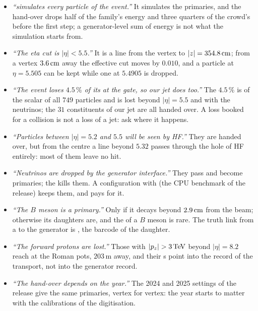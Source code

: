 \begin{pitfalls}
\begin{itemize}[nosep]
  \item \emph{``\GEANT simulates every particle of the event.''} It
    simulates the primaries, and the hand-over drops half of the family's
    energy and three quarters of the crowd's before the first step; a
    generator-level sum of energy is not what the simulation starts from.
  \item \emph{``The eta cut is $|\eta|<5.5$.''} It is a line from the vertex
    to $|z|=354.8\,\mathrm{cm}$; from a vertex $3.6\,\mathrm{cm}$ away the effective cut moves by
    $0.010$, and a particle at $\eta=5.505$ can be kept while one at $5.4905$
    is dropped.
  \item \emph{``The event loses $4.5\,\%$ of its \pt at the gate, so our
    jet does too.''} The $4.5\,\%$ is of the scalar \pt of all $749$
    particles and is lost beyond $|\eta|=5.5$ and with the neutrinos; the
    $31$ constituents of our jet are all handed over. A loss booked for a
    collision is not a loss of a jet: ask where it happens.
  \item \emph{``Particles between $|\eta|=5.2$ and $5.5$ will be seen by HF.''}
    They are handed over, but from the centre a line beyond $5.32$ passes
    through the hole of HF entirely: most of them leave no hit.
  \item \emph{``Neutrinos are dropped by the generator interface.''} They pass
     and become primaries; the  kills
    them. A configuration with  (the CPU benchmark
    of the release) keeps them, and pays for it.
  \item \emph{``The $B$ meson is a \GEANT primary.''} Only if it decays
    beyond $2.9\,\mathrm{cm}$ from the beam; otherwise its daughters are, and the
     of a $B$ meson is rare. The truth link from a
     to the generator is , the barcode of
    the daughter.
  \item \emph{``The forward protons are lost.''} Those with $|p_z|>3\TeV$
    beyond $|\eta|=8.2$ reach \GEANT at the Roman pots, $203$\,m away, and
    their s point into the record of the transport, not into
    the generator record.
  \item \emph{``The hand-over depends on the year.''} The 2024 and 2025
    settings of the release give the same primaries, vertex for vertex: the
    year starts to matter with the calibrations of the digitisation.
\end{itemize}
\end{pitfalls}

